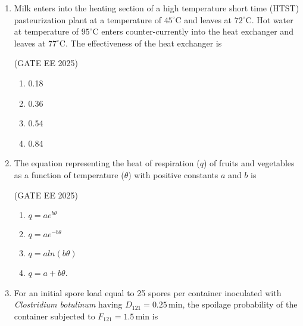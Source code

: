 \documentclass[journal,12pt,onecolumn]{IEEEtran}
\theoremstyle{remark}
\begin{document}
\begin{enumerate}
\hfill(GATE EE 2025)

\begin{multicols}{4}
\begin{enumerate}
    \item 60.44
    \item 104.69
    \item 306.00
    \item 530.01
\end{enumerate}
\end{multicols}

\item Milk enters into the heating section of a high temperature short time (HTST) pasteurization plant at a temperature of $45^{\circ}\mathrm{C}$ and leaves at $72^{\circ}\mathrm{C}$. Hot water at temperature of $95^{\circ}\mathrm{C}$ enters counter-currently into the heat exchanger and leaves at $77^{\circ}\mathrm{C}$. The effectiveness of the heat exchanger is\

\hfill(GATE EE 2025)

\begin{multicols}{4}
\begin{enumerate}
    \item 0.18
    \item 0.36
    \item 0.54
    \item 0.84
\end{enumerate}
\end{multicols}

\item The equation representing the heat of respiration ($q$) of fruits and vegetables as a function of temperature ($\theta$) with positive constants $a$ and $b$ is\

\hfill(GATE EE 2025)

\begin{multicols}{2}
\begin{enumerate}
    \item $q = a e^{b\theta}$
    \item $q = a e^{-b\theta}$
    \item $q = aln(b\theta)$
    \item $q = a + b\theta$.
\end{enumerate}
\end{multicols}

\item For an initial spore load equal to 25 spores per container inoculated with \emph{Clostridium botulinum} having $D_{121}=0.25\,\mathrm{min}$, the spoilage probability of the container subjected to $F_{121}=1.5\,\mathrm{min}$ is\


\end{enumerate}
\end{document}
